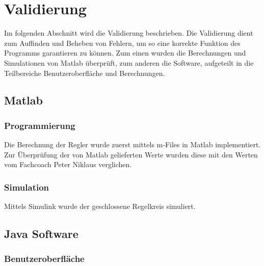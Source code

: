 \usepackage{caption}
\usepackage{subcaption}

\section{Validierung}
Im folgenden Abschnitt wird die Validierung beschrieben. Die Validierung dient zum Auffinden und Beheben von Fehlern, um so eine korrekte Funktion des Programms garantieren zu können. Zum einen wurden die Berechnungen und Simulationen von Matlab überprüft, zum anderen die Software, aufgeteilt in die Teilbereiche Benutzeroberfläche und Berechnungen.

\subsection{Matlab}

\subsubsection{Programmierung}
Die Berechnung der Regler wurde zuerst mittels m-Files in Matlab implementiert. Zur Überprüfung der von Matlab gelieferten Werte wurden diese mit den Werten vom Fachcoach Peter Niklaus verglichen.


\subsubsection{Simulation}
Mittels Simulink wurde der geschlossene Regelkreis simuliert.

\subsection{Java Software}

\subsubsection{Benutzeroberfläche}


